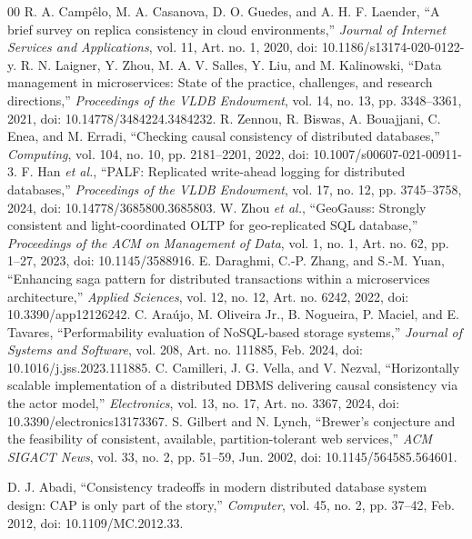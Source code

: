 \documentclass[conference]{IEEEtran}
\begin{document}
\begin{thebibliography}{00}
 R. A. Campêlo, M. A. Casanova, D. O. Guedes, and A. H. F. Laender, ``A brief survey on replica consistency in cloud environments,'' \textit{Journal of Internet Services and Applications}, vol. 11, Art. no. 1, 2020, doi: 10.1186/s13174-020-0122-y.
 R. N. Laigner, Y. Zhou, M. A. V. Salles, Y. Liu, and M. Kalinowski, ``Data management in microservices: State of the practice, challenges, and research directions,'' \textit{Proceedings of the VLDB Endowment}, vol. 14, no. 13, pp. 3348--3361, 2021, doi: 10.14778/3484224.3484232.
 R. Zennou, R. Biswas, A. Bouajjani, C. Enea, and M. Erradi, ``Checking causal consistency of distributed databases,'' \textit{Computing}, vol. 104, no. 10, pp. 2181--2201, 2022, doi: 10.1007/s00607-021-00911-3.
 F. Han \textit{et al.}, ``PALF: Replicated write-ahead logging for distributed databases,'' \textit{Proceedings of the VLDB Endowment}, vol. 17, no. 12, pp. 3745--3758, 2024, doi: 10.14778/3685800.3685803.
 W. Zhou \textit{et al.}, ``GeoGauss: Strongly consistent and light-coordinated OLTP for geo-replicated SQL database,'' \textit{Proceedings of the ACM on Management of Data}, vol. 1, no. 1, Art. no. 62, pp. 1--27, 2023, doi: 10.1145/3588916.
 E. Daraghmi, C.-P. Zhang, and S.-M. Yuan, ``Enhancing saga pattern for distributed transactions within a microservices architecture,'' \textit{Applied Sciences}, vol. 12, no. 12, Art. no. 6242, 2022, doi: 10.3390/app12126242.
 C. Araújo, M. Oliveira Jr., B. Nogueira, P. Maciel, and E. Tavares, ``Performability evaluation of NoSQL-based storage systems,'' \textit{Journal of Systems and Software}, vol. 208, Art. no. 111885, Feb. 2024, doi: 10.1016/j.jss.2023.111885.
 C. Camilleri, J. G. Vella, and V. Nezval, ``Horizontally scalable implementation of a distributed DBMS delivering causal consistency via the actor model,'' \textit{Electronics}, vol. 13, no. 17, Art. no. 3367, 2024, doi: 10.3390/electronics13173367.
S. Gilbert and N. Lynch,
``Brewer's conjecture and the feasibility of consistent,
available, partition-tolerant web services,''
\textit{ACM SIGACT News},
vol. 33, no. 2, pp. 51--59, Jun. 2002,
doi: 10.1145/564585.564601.

D. J. Abadi,
``Consistency tradeoffs in modern distributed database
system design: CAP is only part of the story,''
\textit{Computer},
vol. 45, no. 2, pp. 37--42, Feb. 2012,
doi: 10.1109/MC.2012.33.


\end{thebibliography}
\end{document}
